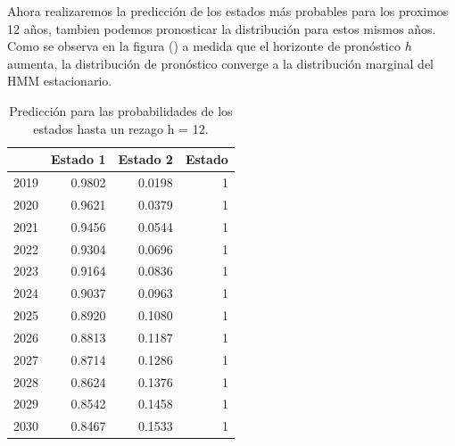 \documentclass[a4paper]{article}\usepackage[]{graphicx}\usepackage[]{color}
\begin{document}
Ahora realizaremos la predicción de los estados más probables para los proximos 12 años, tambien podemos pronosticar la distribución para estos mismos años. Como se observa en la figura () a medida que el horizonte de pronóstico $h$ aumenta, la distribución de pronóstico converge a la distribución marginal del HMM estacionario.

\begin{table}[ht]
\centering
\begin{tabular}{rrrr}
  \hline
 & Estado 1 & Estado 2 & Estado \\ 
  \hline
2019 & 0.9802 & 0.0198 &     1 \\ 
  2020 & 0.9621 & 0.0379 &     1 \\ 
  2021 & 0.9456 & 0.0544 &     1 \\ 
  2022 & 0.9304 & 0.0696 &     1 \\ 
  2023 & 0.9164 & 0.0836 &     1 \\ 
  2024 & 0.9037 & 0.0963 &     1 \\ 
  2025 & 0.8920 & 0.1080 &     1 \\ 
  2026 & 0.8813 & 0.1187 &     1 \\ 
  2027 & 0.8714 & 0.1286 &     1 \\ 
  2028 & 0.8624 & 0.1376 &     1 \\ 
  2029 & 0.8542 & 0.1458 &     1 \\ 
  2030 & 0.8467 & 0.1533 &     1 \\ 
   \hline
\end{tabular}
\caption{Predicción para las probabilidades de los estados hasta un rezago h = 12.} 
\end{table}
\end{document}
